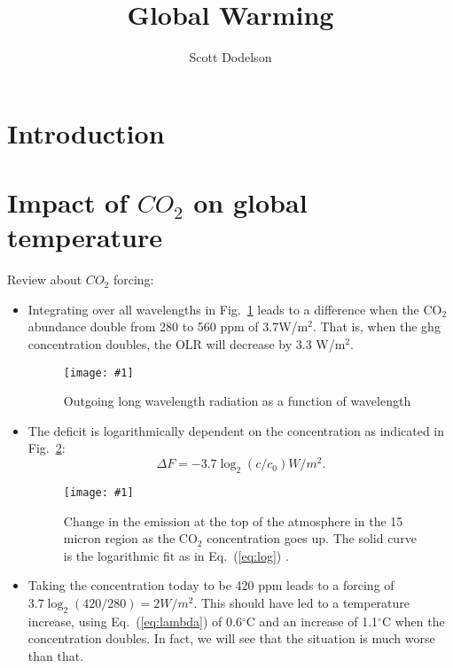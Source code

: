 \documentclass[tsecnumarabic,amssymb, nobibnotes, aps, prd]{revtex4-2}
\def\be{\begin{equation}}
\def\ee{\end{equation}}
\newcommand{\ec}[1]{Eq.~(\ref{eq:#1})}
\newcommand{\eql}[1]{\label{eq:#1}}
\newcommand{\sfig}[2]{
\texttt{[image: \#1]}
        }
\newcommand{\Spng}[2]{
   \begin{figure}[thbp]
   \begin{center}
    \sfig{Figures/#1.png}{0.8\columnwidth}
    \caption{{\small #2}}
    \label{fig:#1}
     \end{center}
   \end{figure}
}
\newcommand{\rf}[1]{\ref{fig:#1}}
\newcommand\bei{\begin{itemize}}
\newcommand\eei{\end{itemize}}
\begin{document}
\title{Global Warming}
\author{Scott Dodelson}
\begin{abstract}
\end{abstract}

\maketitle

\section{Introduction}

\section{Impact of $CO_2$ on global temperature}
Review about $CO_2$ forcing:
\bei
\item Integrating over all wavelengths in Fig.~\rf{olr} leads to a difference when the CO$_2$ abundance double from 280 to 560 ppm of 3.7W/m$^2$. That is, when the ghg concentration doubles, the OLR will decrease by 3.3 W/m$^2$. 
\Spng{olr}{Outgoing long wavelength radiation as a function of wavelength}
\item The deficit is logarithmically dependent on the concentration as indicated in Fig.~\rf{olrlog}:
\be
\Delta F = -3.7\log_2(c/c_0) W/m^2.\eql{log}\ee 
\Spng{olrlog}{Change in the emission at the top of the atmosphere in the 15 micron region as the CO$_2$ concentration goes up. The solid curve is the logarithmic fit as in \ec{log} .}
\item Taking the concentration today to be 420 ppm leads to a forcing of $3.7\log_2(420/280)=2 W/m^2$. This should have led to a temperature increase, using \ec{lambda} of 0.6$^\circ$C and an increase of 1.1$^\circ$C when the concentration doubles. In fact, we will see that the situation is much worse than that.
\eei
\end{document}
